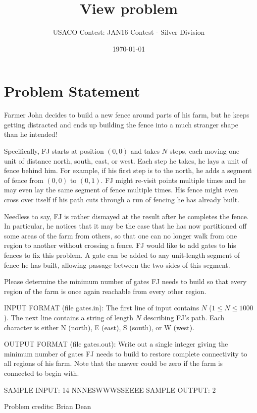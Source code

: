 \documentclass[12pt]{article}
\title{View problem}
\author{USACO Contest: JAN16 Contest - Silver Division}
\date{\today}
\begin{document}
\maketitle

\section*{Problem Statement}

Farmer John decides to build a new fence around parts of his farm, but he keeps
getting distracted and ends up building the fence into a much stranger shape
than he intended!

Specifically, FJ starts at position $(0,0)$ and takes $N$ steps, each moving one
unit of distance north, south, east, or west.  Each step he  takes, he lays a
unit of fence behind him.  For example, if his first step is to the north, he
adds a segment of fence from $(0,0)$ to $(0,1)$. FJ might re-visit points
multiple times and he may even lay the same segment of fence multiple times. 
His fence might even cross over itself if his  path cuts through a run of
fencing he has already built.

Needless to say, FJ is rather dismayed at the result after he completes the
fence.  In particular, he notices that it may be the case that he has now
partitioned off some areas of the farm from others, so that one can no longer
walk from one region to another without crossing a fence. FJ would like to add
gates to his fences to fix this problem.  A gate can be added to any unit-length
segment of fence he has built, allowing passage between the two sides of this
segment.  

Please determine the minimum number of gates FJ needs to build so that every
region of the farm is once again reachable from every other region.

INPUT FORMAT (file gates.in):
The first line of input contains $N$ ($1 \leq N \leq 1000$). The next line
contains a string of length $N$ describing FJ's path. Each character is either N
(north), E (east), S (south), or W (west).

OUTPUT FORMAT (file gates.out):
Write out a single integer giving the minimum number of gates FJ needs to build
to restore complete connectivity to all regions of his farm. Note that the
answer could be zero if the farm is connected to begin with.

SAMPLE INPUT:
14
NNNESWWWSSEEEE
SAMPLE OUTPUT: 
2

Problem credits: Brian Dean
\end{document}
